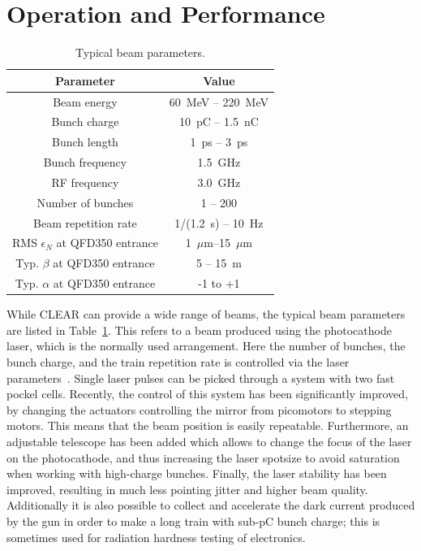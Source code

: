\documentclass[a4paper,
               keeplastbox,   %
               ]{jacow}
\begin{document}
\section{Operation and Performance}

\begin{table}[t]
  \centering
  \caption{Typical beam parameters.}
  \label{tab:beamparameters}
  \begin{tabular}{c c}
    \toprule
    \textbf{Parameter} & \textbf{Value} \\
    \midrule
    Beam energy       &  60~MeV -- 220~MeV\\
    Bunch charge      &  10~pC  -- 1.5~nC \\
    Bunch length      &   1~ps  -- 3~ps \\
    Bunch frequency   &   1.5~GHz \\
    RF frequency      &   3.0~GHz \\
    Number of bunches &   1 -- 200 \\
    Beam repetition rate   & 1/(1.2~s) -- 10~Hz \\
    RMS $\epsilon_N$ at QFD350 entrance & 1~$\mu$m--15~$\mu$m\\
    Typ. $\beta$ at QFD350 entrance & 5 -- 15~m \\
    Typ. $\alpha$ at QFD350 entrance & -1 to +1 \\
    \bottomrule
  \end{tabular}
\end{table}

While CLEAR can provide a wide range of beams, the typical beam parameters are listed in Table~\ref{tab:beamparameters}.
This refers to a beam produced using the photocathode laser, which is the normally used arrangement.
Here the number of bunches, the bunch charge, and the train repetition rate is controlled via the laser parameters~\cite{LucaGun,BrossardGun}.
Single laser pulses can be picked through a system with two fast pockel cells.
Recently, the control of this system has been significantly improved, by changing the actuators controlling the mirror from picomotors to stepping motors.
This means that the beam position is easily repeatable.
Furthermore, an adjustable telescope has been added which allows to change the focus of the laser on the photocathode, and thus increasing the laser spotsize to avoid saturation when working with high-charge bunches.
Finally, the laser stability has been improved, resulting in much less pointing jitter and higher beam quality.
Additionally it is also possible to collect and accelerate the dark current produced by the gun in order to make a long train with sub-pC bunch charge; this is sometimes used for radiation hardness testing of electronics.
\end{document}
